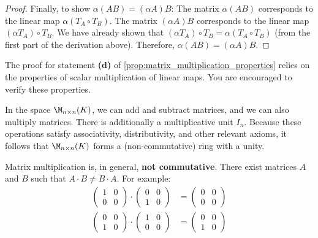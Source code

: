 \begin{proof}
Finally, to show $\alpha(AB) = (\alpha A)B$:
The matrix $\alpha(AB)$ corresponds to the linear map $\alpha(T_A \circ T_B)$.
The matrix $(\alpha A)B$ corresponds to the linear map $(\alpha T_A) \circ T_B$.
We have already shown that $(\alpha T_A) \circ T_B = \alpha (T_A \circ T_B)$ (from the first part of the derivation above).
Therefore, $\alpha(AB) = (\alpha A)B$.
\end{proof}

\begin{exercise}
The proof for statement \textbf{(d)} of \cref{prop:matrix_multiplication_properties} relies on the properties of scalar multiplication of linear maps. You are encouraged to verify these properties.
\end{exercise}

\begin{remark}
In the space $\M_{n \times n}(K)$, we can add and subtract matrices, and we can also multiply matrices. There is additionally a multiplicative unit $I_n$. Because these operations satisfy associativity, distributivity, and other relevant axioms, it follows that $\M_{n \times n}(K)$ forms a (non-com\-mu\-ta\-tive) ring with a unity.
\end{remark}

\begin{importantremark}
Matrix multiplication is, in general, \textbf{not commutative}. There exist matrices $A$ and $B$ such that $A \cdot B \neq B \cdot A$. For example:
\begin{align*}
    \begin{pmatrix} 1 & 0 \\ 0 & 0 \end{pmatrix} \cdot \begin{pmatrix} 0 & 0 \\ 1 & 0 \end{pmatrix} &= \begin{pmatrix} 0 & 0 \\ 0 & 0 \end{pmatrix} \\
    \begin{pmatrix} 0 & 0 \\ 1 & 0 \end{pmatrix} \cdot \begin{pmatrix} 1 & 0 \\ 0 & 0 \end{pmatrix} &= \begin{pmatrix} 0 & 0 \\ 1 & 0 \end{pmatrix}
\end{align*}
\end{importantremark}

